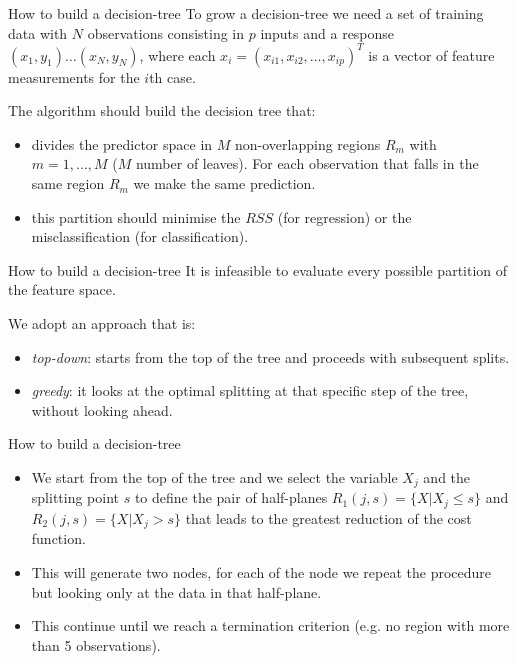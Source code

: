 \documentclass[notes]{beamer}          %
\begin{document}
\begin{frame}{How to build a decision-tree}
To grow a decision-tree we need a set of training data with $N$ observations consisting in $p$ inputs and a response
$(x_1,y_1) \dots (x_N,y_N)$, where each $x_i=(x_{i1}, x_{i2}, \dots, x_{ip})^T$ is a vector of feature measurements for the $i$th case.

\vspace{0.5cm}

The algorithm should build the decision tree that:

\begin{itemize}
\item divides the predictor space in $M$ non-overlapping regions $R_m$ with $m=1,...,M$ ($M$ number of leaves). For each observation that falls in the same region $R_m$ we make the same prediction.
\item this partition should minimise the $RSS$ (for regression) or the misclassification (for classification).
\end{itemize}
\end{frame}

\begin{frame}{How to build a decision-tree}
It is infeasible to evaluate every possible partition of the feature space.

\vspace{0.5cm}
We adopt an approach that is:
\begin{itemize}
	\item \textit{top-down}: starts from the top of the tree and proceeds with subsequent splits.
	\item \textit{greedy}: it looks at the optimal splitting at that specific step of the tree, without looking ahead. 
\end{itemize}
\end{frame}

\begin{frame}{How to build a decision-tree}
\begin{itemize}
	\item We start from the top of the tree and we select the variable $X_j$ and the splitting point $s$ to define the pair of half-planes $R_1(j,s)=\{X|X_j \le s\}$ and $R_2(j,s)=\{X|X_j > s\}$ that leads to the greatest reduction of the cost function.
	\item This will generate two nodes, for each of the node we repeat the procedure but looking only at the data in that half-plane. 
	\item This continue until we reach a termination criterion (e.g. no region with more than 5 observations).
\end{itemize}	

\end{frame}
\end{document}
